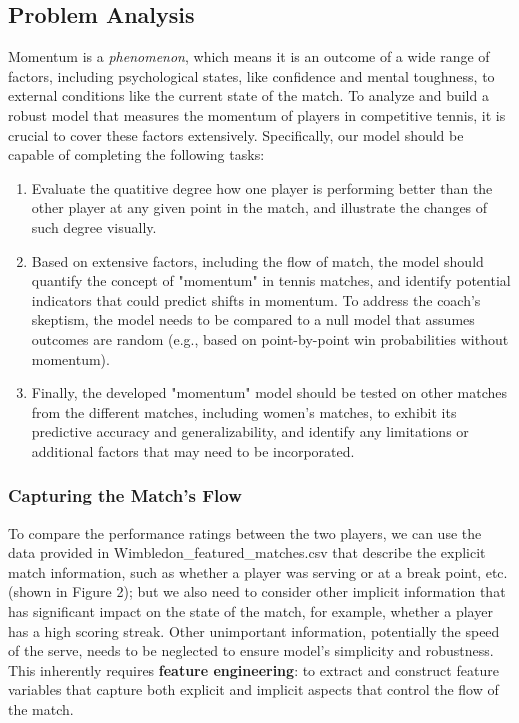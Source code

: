 \documentclass[12pt]{article}  %
\begin{document}
\subsection{Problem Analysis}

Momentum is a \textit{phenomenon}, which means it is an outcome of a wide range of factors, including psychological states, like confidence and mental toughness, to external conditions like the current state of the match. To analyze and build a robust model that measures the momentum of players in competitive tennis, it is crucial to cover these factors extensively. Specifically, our model should be capable of completing the following tasks:

\begin{enumerate}[\bfseries (1)]
\setlength{\parsep}{0ex} %
\setlength{\topsep}{2ex} %
\setlength{\itemsep}{1ex} %
\item Evaluate the quatitive degree how one player is performing better than the other player at any given point in the match, and illustrate the changes of such degree visually.
\item Based on extensive factors, including the flow of match, the model should quantify the concept of "momentum" in tennis matches, and identify potential indicators that could predict shifts in momentum. To address the coach’s skeptism, the model needs to be compared to a null model that assumes outcomes are random (e.g., based on point-by-point win probabilities without momentum).
\item Finally, the developed "momentum" model should be tested on other matches from the different matches, including women's matches, to exhibit its predictive accuracy and generalizability, and identify any limitations or additional factors that may need to be incorporated. 
\end{enumerate}

\subsubsection{Capturing the Match's Flow}
To compare the performance ratings between the two players, we can use the data provided in Wimbledon\_featured\_matches.csv that describe the explicit match information, such as whether a player was serving or at a break point, etc. (shown in Figure 2); but we also need to consider other implicit information that has significant impact on the state of the match, for example, whether a player has a high scoring streak. Other unimportant information, potentially the speed of the serve, needs to be neglected to ensure model's simplicity and robustness. This inherently requires \textbf{feature engineering}: to extract and construct feature variables that capture both explicit and implicit aspects that control the flow of the match.
\end{document}
